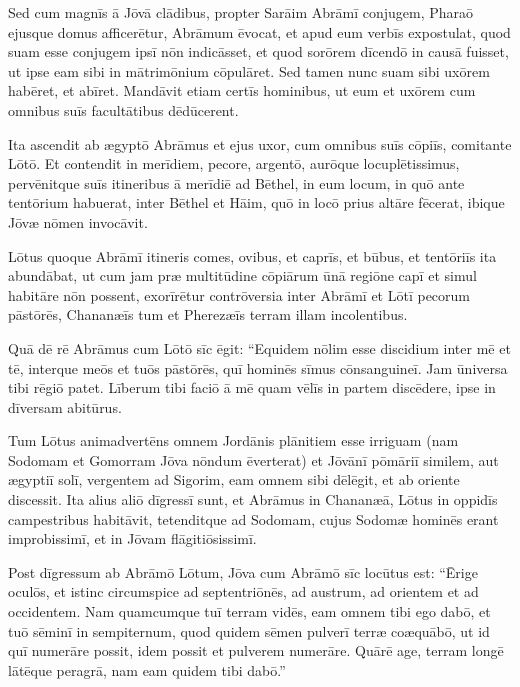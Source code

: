\Versus Sed cum magnīs ā Jōvā clādibus, propter Sarāim Abrāmī conjugem, Pharaō ejusque domus afficerētur,
\Versus Abrāmum ēvocat, et apud eum verbīs expostulat, quod suam esse conjugem ipsī nōn indicāsset,
\Versus et quod sorōrem dīcendō in causā fuisset, ut ipse eam sibi in mātrimōnium cōpulāret. Sed tamen nunc suam sibi uxōrem habēret, et abīret.
\Versus Mandāvit etiam certīs hominibus, ut eum et uxōrem cum omnibus suīs facultātibus dēdūcerent.



\Caput
\Versus Ita ascendit ab ægyptō Abrāmus et ejus uxor, cum omnibus suīs cōpiīs, comitante Lōtō. Et contendit in merīdiem,
\Versus pecore, argentō, aurōque locuplētissimus,
\Versus pervēnitque suīs itineribus ā merīdiē ad Bēthel, in eum locum, in quō ante tentōrium habuerat, inter Bēthel et Hāim,
\Versus quō in locō prius altāre fēcerat, ibique Jōvæ nōmen invocāvit.

\Versus Lōtus quoque Abrāmī itineris comes, ovibus, et caprīs, et būbus, et tentōriīs ita abundābat,
\Versus ut cum jam præ multitūdine cōpiārum ūnā regiōne capī et simul habitāre nōn possent,
\Versus exorīrētur contrōversia inter Abrāmī et Lōtī pecorum pāstōrēs, Chananæīs tum et Pherezæīs terram illam incolentibus.

\Versus Quā dē rē Abrāmus cum Lōtō sīc ēgit: ``Equidem nōlim esse discidium inter mē et tē, interque meōs et tuōs pāstōrēs, quī hominēs sīmus cōnsanguineī.
\Versus Jam ūniversa tibi rēgiō patet. Līberum tibi faciō ā mē quam vēlīs in partem discēdere, ipse in dīversam abitūrus.

\Versus Tum Lōtus animadvertēns omnem Jordānis plānitiem esse irriguam (nam Sodomam et Gomorram Jōva nōndum ēverterat) et Jōvānī pōmāriī similem, aut ægyptiī solī, vergentem ad Sigorim,
\Versus eam omnem sibi dēlēgit, et ab oriente discessit. Ita alius aliō dīgressī sunt,
\Versus et Abrāmus in Chananæā, Lōtus in oppidīs campestribus habitāvit, tetenditque ad Sodomam,
\Versus cujus Sodomæ hominēs erant improbissimī, et in Jōvam flāgitiōsissimī.

\Versus Post dīgressum ab Abrāmō Lōtum, Jōva cum Abrāmō sīc locūtus est: ``Ērige oculōs, et istinc circumspice ad septentriōnēs, ad austrum, ad orientem et ad occidentem.
\Versus Nam quamcumque tuī terram vidēs, eam omnem tibi ego dabō, et tuō sēminī in sempiternum,
\Versus quod quidem sēmen pulverī terræ coæquābō, ut id quī numerāre possit, idem possit et pulverem numerāre.
\Versus Quārē age, terram longē lātēque peragrā, nam eam quidem tibi dabō.''

